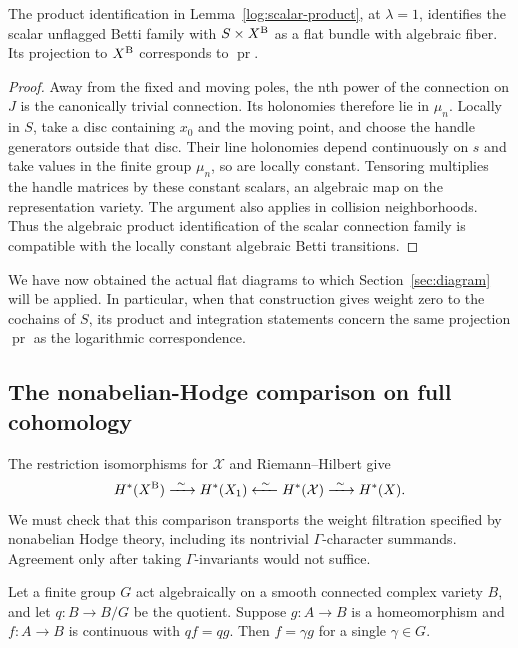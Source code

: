 \begin{lemma}
\label{log:scalar-flat-product}
The product identification in Lemma~\ref{log:scalar-product}, at
$\lambda=1$, identifies the scalar unflagged Betti family with
$S\times X^{\rm B}$ as a flat bundle with algebraic fiber.  Its
projection to $X^{\rm B}$ corresponds to $\operatorname{pr}$.
\end{lemma}

\begin{proof}
Away from the fixed and moving poles, the nth power of the connection
on $J$ is the canonically trivial connection.  Its holonomies
therefore lie in $\mu_n$.  Locally in $S$, take a disc containing
$x_0$ and the moving point, and choose the handle generators outside
that disc.  Their line holonomies depend continuously on $s$ and
take values in the finite group $\mu_n$, so are locally constant.
Tensoring multiplies the handle matrices by these constant scalars,
an algebraic map on the representation variety.  The argument also
applies in collision neighborhoods.  Thus the algebraic product
identification of the scalar connection family is compatible with
the locally constant algebraic Betti transitions.
\end{proof}

We have now obtained the actual flat diagrams to which
Section~\ref{sec:diagram} will be applied.  In particular, when that
construction gives weight zero to the cochains of $S$, its product
and integration statements concern the same projection
$\operatorname{pr}$ as the logarithmic correspondence.

\subsection{The nonabelian-Hodge comparison on full cohomology}

The restriction isomorphisms for $\mathcal X$ and Riemann--Hilbert give
\begin{equation}
 H^*(X^{\rm B})\xrightarrow{\ \sim\ }H^*(X_1)
 \xleftarrow{\ \sim\ }H^*(\mathcal X)
 \xrightarrow{\ \sim\ }H^*(X).
 \label{log:comparison}
\end{equation}
We must check that this comparison transports the weight filtration
specified by nonabelian Hodge theory, including its nontrivial
$\Gamma$-character summands.  Agreement only after taking
$\Gamma$-invariants would not suffice.

\begin{lemma}
\label{log:finite-ambiguity}
Let a finite group $G$ act algebraically on a smooth connected complex
variety $B$, and let $q:B\to B/G$ be the quotient.  Suppose
$g:A\to B$ is a homeomorphism and $f:A\to B$ is continuous with
$qf=qg$.  Then $f=\gamma g$ for a single $\gamma\in G$.
\end{lemma}

